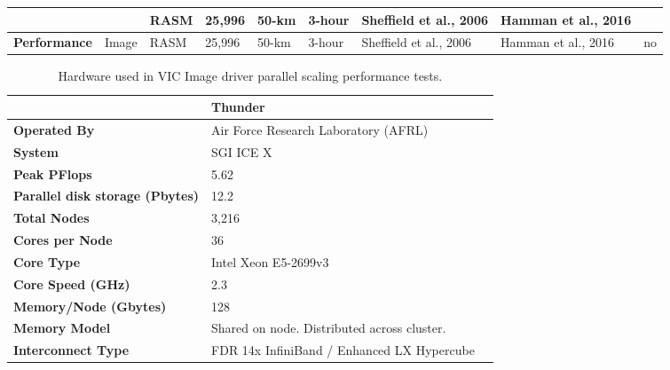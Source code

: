 \documentclass[gmd, manuscript]{copernicus}
\begin{document}
\begin{landscape}
\begin{table}[]
{\begin{tabular}{|l|l|l|l|l|l|l|l|l|}
                                  &                              & RASM            & 25,996              & 50-km               & 3-hour            & Sheffield et al., 2006 & Hamman et al., 2016 &                     \\ \hline
\textbf{Performance}              & Image                        & RASM            & 25,996              & 50-km               & 3-hour            & Sheffield et al., 2006 & Hamman et al., 2016 & no                  \\ \hline
\end{tabular}
}
\end{table}
\end{landscape}

\clearpage
\begin{table}[]
\centering
\caption{Hardware used in VIC Image driver parallel scaling performance tests.}
\label{table:hardware}
  \begin{tabular}{|l|l|l|}
    \hline
    \textbf{}                                & \textbf{Thunder}                            \\ \hline
    \textbf{Operated By}                     & Air Force Research Laboratory (AFRL)        \\ \hline
    \textbf{System}                          & SGI ICE X                                   \\ \hline
    \textbf{Peak PFlops}                     & 5.62                                        \\ \hline
    \textbf{Parallel disk storage (Pbytes)}  & 12.2                                        \\ \hline
    \textbf{Total Nodes}                     & 3,216                                       \\ \hline
    \textbf{Cores per Node}                      & 36                                      \\ \hline
    \textbf{Core Type}                       & Intel Xeon E5-2699v3                        \\ \hline
    \textbf{Core Speed (GHz)}                & 2.3                                         \\ \hline
    \textbf{Memory/Node (Gbytes)}            & 128                                         \\ \hline
    \textbf{Memory Model}                    & Shared on node. Distributed across cluster. \\ \hline
    \textbf{Interconnect Type}               & FDR 14x InfiniBand / Enhanced LX Hypercube  \\ \hline
  \end{tabular}
\end{table}
\end{document}
